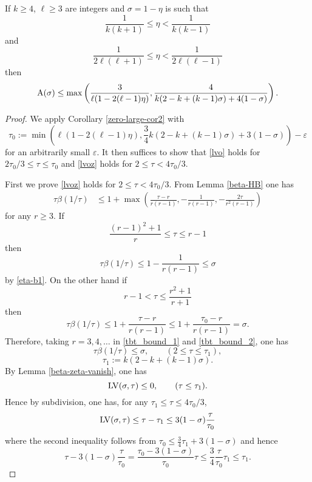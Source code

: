 \begin{theorem}\label{pintz-density-subdiv} If $k \geq 4$, $\ell \geq 3$ are integers and $\sigma = 1-\eta$ is such that
\begin{equation}\label{eta-b1}
    \frac{1}{k(k+1)} \leq \eta < \frac{1}{k(k-1)}
\end{equation}
and
\begin{equation}\label{eta-l1}
 \frac{1}{2\ell(\ell+1)} \leq \eta < \frac{1}{2\ell(\ell-1)}
\end{equation}
then
$$ \mathrm{A}(\sigma) \leq \max\left( \frac{3}{\ell(1-2(\ell-1)\eta)}, \frac{4}{k(2-k+(k-1)\sigma) + 4(1-\sigma)}\right).$$
\end{theorem}
\begin{proof} 
We apply Corollary \ref{zero-large-cor2} with
\begin{equation}\label{tau0-def}
\tau_0 := \min( \ell (1 - 2(\ell-1) \eta), \frac{3}{4} k(2-k+(k-1)\sigma) + 3(1 - \sigma)) - \varepsilon
\end{equation}
for an arbitrarily small $\varepsilon$.
It then suffices to show that \eqref{lvo} holds for $2\tau_0/3 \leq \tau \leq \tau_0$ and \eqref{lvoz} holds for $2 \leq \tau < 4\tau_0/3$.

First we prove \eqref{lvoz} holds for $2 \leq \tau < 4\tau_0/3$. 
From Lemma \ref{beta-HB} one has
\begin{align*}
\tau \beta(1/\tau) &\leq 1 + \max\left( \frac{\tau-r}{r(r-1)}, -\frac{1}{r(r-1)}, - \frac{2\tau}{r^2(r-1)}\right)
\end{align*}
for any $r \ge 3$. If 
\[
\frac{(r-1)^2+1}{r}\leq \tau \leq r-1
\]
then 
\begin{equation}\label{tbt_bound_1}
\tau \beta(1/\tau) \le 1-\frac{1}{r(r-1)} \le \sigma 
\end{equation}
by \eqref{eta-b1}. On the other hand if 
\[
r - 1 < \tau \le \frac{r^2+1}{r+1}
\]
then 
\begin{equation}\label{tbt_bound_2}
\tau \beta(1/\tau) \le 1+\frac{\tau-r}{r(r-1)} \le 1+\frac{\tau_0 - r}{r(r-1)} = \sigma. 
\end{equation}
Therefore, taking $r = 3, 4, \ldots$ in \eqref{tbt_bound_1} and \eqref{tbt_bound_2}, one has 
\[
\tau \beta(1/\tau) \le \sigma,\qquad (2 \le \tau \le \tau_1),
\]
\[
\tau_1 := k(2 - k + (k - 1)\sigma).
\]
By Lemma \ref{beta-zeta-vanish}, one has
\[
\mathrm{LV}(\sigma, \tau) \leq 0,\qquad (\tau \le \tau_1).
\]
Hence by subdivision, one has, for any $\tau_1 \le \tau \le 4\tau_0/3$,
\[
\mathrm{LV}(\sigma, \tau) \le \tau - \tau_1 \le 3(1 - \sigma)\frac{\tau}{\tau_0}
\]
where the second inequality follows from $\tau_0 \le \frac{3}{4}\tau_1 + 3(1 - \sigma)$ and hence 
\[
\tau - 3(1 - \sigma)\frac{\tau}{\tau_0} = \frac{\tau_0 - 3(1 - \sigma)}{\tau_0}\tau \le \frac{3}{4}\frac{\tau}{\tau_0}\tau_1 \le \tau_1.
\]



\end{proof}
